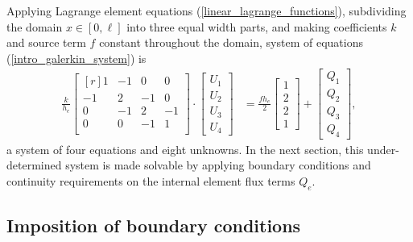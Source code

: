 Applying Lagrange element equations (\ref{linear_lagrange_functions}), subdividing the domain $x \in [0,\ell]$ into three equal width parts, and making coefficients $k$ and source term $f$ constant throughout the domain, system of equations (\ref{intro_galerkin_system}) is 
\begin{align} 
  \label{intro_expanded_global_system}
  \frac{k}{h_e}
  \begin{bmatrix}[r]
     1 & -1 &  0 &  0 \\
    -1 &  2 & -1 &  0 \\
     0 & -1 &  2 & -1 \\
     0 &  0 & -1 &  1 \\
  \end{bmatrix} \cdot
  \begin{bmatrix} U_1 \\ U_2 \\ U_3 \\ U_4 \end{bmatrix} &=
  \frac{f h_e}{2}
  \begin{bmatrix} 1   \\ 2   \\ 2   \\ 1   \end{bmatrix} +
  \begin{bmatrix} Q_1 \\ Q_2 \\ Q_3 \\ Q_4 \end{bmatrix},
\end{align}
a system of four equations and eight unknowns.  In the next section, this under-determined system is made solvable by applying boundary conditions and continuity requirements on the internal element flux terms $Q_e$.

\subsection{Imposition of boundary conditions}
  
